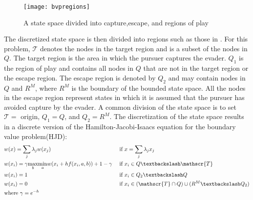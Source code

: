 \begin{figure}
\centering
\texttt{[image: bvpregions]}
\caption{A state space divided into capture,escape, and regions of play \cite{bardi2}}
\label{bvpregions}
\end{figure}
The discretized state space is then divided into regions such as those in . For this problem, $\mathscr{T}$ denotes the nodes in the target region and is a subset of the nodes in $Q$. The target region is the area in which the pursuer captures the evader. $Q_1$ is the region of play and contains all nodes in $Q$ that are not in the target region or the escape region. The escape region is denoted by $Q_2$ and may contain nodes in $Q$ and $R^M$, where $R^M$ is the boundary of the bounded state space. All the nodes in the escape region represent states in which it is assumed that the pursuer has avoided capture by the evader. A common division of the state space is to set $\mathscr{T}=$ origin, $Q_1 = Q$, and $Q_2 = R^M$. The discretization of the state space results in a discrete version of the Hamilton-Jacobi-Isaacs equation for the boundary value problem(HJD):
\begin{align}\label{dbvp}
  & w(x)  =  \sum_j\lambda_jw(x_j) && \textnormal{ if } x = \sum_j\lambda_jx_j\\
  & w(x_i)  =  \gamma\underset{b}{\operatorname{max}}\underset{a}{\operatorname{min}}w(x_i +hf(x_i,a,b))+1-\gamma && \textnormal{ if } x_i \in Q\textbackslash \mathscr{T}\\
  & w(x_i) = 1 && \textnormal{ if } x_i \in Q_2\textbackslash Q\\
  & w(x_i) = 0 && \textnormal{ if } x_i \in (\mathscr{T} \cap Q) \cup (R^M \textbackslash Q_2)\\
  & \textnormal{where } \gamma = e^{-h}
\end{align}    


